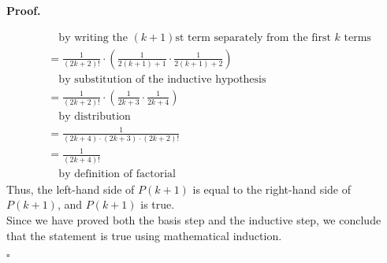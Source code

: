 \documentclass{article}
\newenvironment{proof}{
    \begin{mdframed}[nobreak=false, innerleftmargin=10pt, innerrightmargin=10pt, innertopmargin=10pt, innerbottommargin=10pt]
    \textbf{Proof.}
}{
    \hfill $\square$
    \end{mdframed}
}
\begin{document}
\begin{proof}
\begin{align*}
            & \quad \text{by writing the $(k+1)$st term separately from the first $k$ terms} \\
            &= \frac{1}{(2k+2)!} \cdot \left(\frac{1}{2(k+1)+1} \cdot \frac{1}{2(k+1)+2} \right) \\
            & \quad \text{by substitution of the inductive hypothesis} \\
            &= \frac{1}{(2k+2)!} \cdot \left(\frac{1}{2k+3} \cdot \frac{1}{2k+4} \right) \\
            & \quad \text{by distribution} \\
            &= \frac{1}{(2k+4) \cdot (2k+3) \cdot (2k+2)!} \\
            &= \frac{1}{(2k+4)!} \\
            & \quad \text{by definition of factorial}
        \end{align*}
        Thus, the left-hand side of $P(k+1)$ is equal to the right-hand side of $P(k+1)$, and $P(k+1)$ is true. \\
        Since we have proved both the basis step and the inductive step, we conclude that the statement is true using mathematical induction.
    \end{proof}
\end{document}
